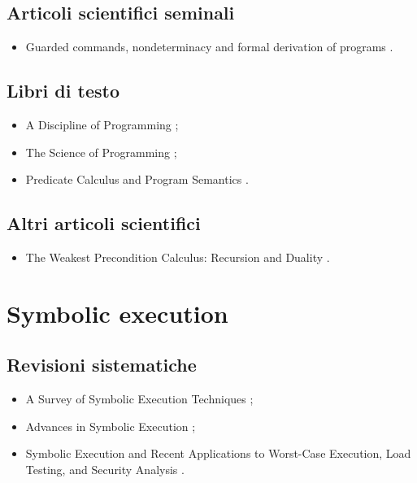 \subsection*{Articoli scientifici seminali}
\begin{itemize}

\item Guarded commands, nondeterminacy and formal derivation of programs \cite{dijkstra1975wpc}.

\end{itemize}

\subsection*{Libri di testo}
\begin{itemize}

\item A Discipline of Programming \cite{dijkstra1976wpcbook};

\item The Science of Programming \cite{gries1987wpcbook};

\item Predicate Calculus and Program Semantics \cite{dijkstra1990wpcbook}.

\end{itemize}

\subsection*{Altri articoli scientifici}
\begin{itemize}

\item The Weakest Precondition Calculus: Recursion and Duality \cite{bonsangue1994wpc}.

\end{itemize}

\section*{Symbolic execution}

\subsection*{Revisioni sistematiche}
\begin{itemize}

\item A Survey of Symbolic Execution Techniques \cite{baldoni2018symbexereview};

\item Advances in Symbolic Execution \cite{yang2019symbexereview};

\item Symbolic Execution and Recent Applications to Worst-Case Execution, Load Testing, and Security Analysis \cite{pasareanu2019symbexereview}.

\end{itemize}

